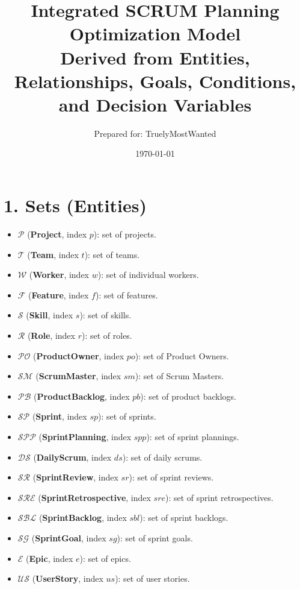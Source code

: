 \documentclass[11pt,a4paper]{article}
\title{Integrated SCRUM Planning Optimization Model\\\large Derived from Entities, Relationships, Goals, Conditions, and Decision Variables}
\author{Prepared for: TruelyMostWanted}
\date{\today}
\begin{document}
\maketitle
\tableofcontents
\newpage

\section{1. Sets (Entities)}
\begin{itemize}[leftmargin=2em]
  \item $\mathcal{P}$ (\textbf{Project}, index $p$): set of projects.
  \item $\mathcal{T}$ (\textbf{Team}, index $t$): set of teams.
  \item $\mathcal{W}$ (\textbf{Worker}, index $w$): set of individual workers.
  \item $\mathcal{F}$ (\textbf{Feature}, index $f$): set of features.
  \item $\mathcal{S}$ (\textbf{Skill}, index $s$): set of skills.
  \item $\mathcal{R}$ (\textbf{Role}, index $r$): set of roles.
  \item $\mathcal{PO}$ (\textbf{ProductOwner}, index $po$): set of Product Owners.
  \item $\mathcal{SM}$ (\textbf{ScrumMaster}, index $sm$): set of Scrum Masters.
  \item $\mathcal{PB}$ (\textbf{ProductBacklog}, index $pb$): set of product backlogs.
  \item $\mathcal{SP}$ (\textbf{Sprint}, index $sp$): set of sprints.
  \item $\mathcal{SPP}$ (\textbf{SprintPlanning}, index $spp$): set of sprint plannings.
  \item $\mathcal{DS}$ (\textbf{DailyScrum}, index $ds$): set of daily scrums.
  \item $\mathcal{SR}$ (\textbf{SprintReview}, index $sr$): set of sprint reviews.
  \item $\mathcal{SRE}$ (\textbf{SprintRetrospective}, index $sre$): set of sprint retrospectives.
  \item $\mathcal{SBL}$ (\textbf{SprintBacklog}, index $sbl$): set of sprint backlogs.
  \item $\mathcal{SG}$ (\textbf{SprintGoal}, index $sg$): set of sprint goals.
  \item $\mathcal{E}$ (\textbf{Epic}, index $e$): set of epics.
  \item $\mathcal{US}$ (\textbf{UserStory}, index $us$): set of user stories.

\end{itemize}
\end{document}
